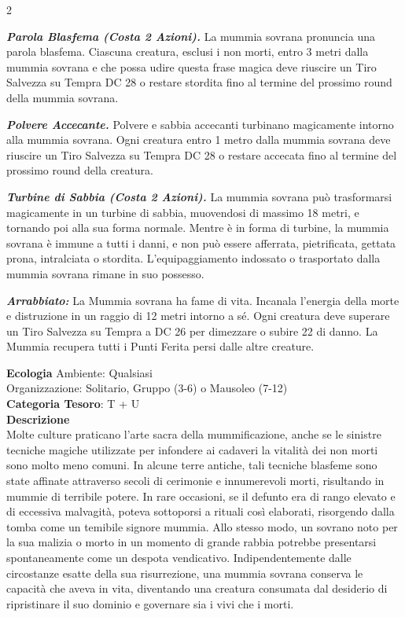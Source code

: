 \begin{multicols}{2}
{\emph{\textbf{Parola Blasfema (Costa 2 Azioni).}} La mummia sovrana pronuncia una parola blasfema. Ciascuna creatura, esclusi i non morti, entro 3 metri dalla mummia sovrana e che possa udire questa frase magica deve riuscire un Tiro Salvezza su Tempra DC 28 o restare stordita fino al termine del prossimo round della mummia sovrana.

\emph{\textbf{Polvere Accecante.}} Polvere e sabbia accecanti turbinano magicamente intorno alla mummia sovrana. Ogni creatura entro 1 metro dalla mummia sovrana deve riuscire un Tiro Salvezza su Tempra DC 28 o restare accecata fino al termine del prossimo round della creatura.

\emph{\textbf{Turbine di Sabbia (Costa 2 Azioni).}} La mummia sovrana può trasformarsi magicamente in un turbine di sabbia, muovendosi di massimo 18 metri, e tornando poi alla sua forma normale. Mentre è in forma di turbine, la mummia sovrana è immune a tutti i danni, e non può essere afferrata, pietrificata, gettata prona, intralciata o stordita. L'equipaggiamento indossato o trasportato dalla mummia sovrana rimane in suo possesso.

\emph{\textbf{Arrabbiato:}} La Mummia sovrana ha fame di vita. Incanala l'energia della morte e distruzione in un raggio di 12 metri intorno a sé. Ogni creatura deve superare un Tiro Salvezza su Tempra a DC 26 per dimezzare o subire 22 di danno. La Mummia recupera tutti i Punti Ferita persi dalle altre creature.

\textbf{Ecologia}
Ambiente: Qualsiasi\\
Organizzazione: Solitario, Gruppo (3-6) o Mausoleo (7-12)\\
\textbf{Categoria Tesoro}: T + U\\
\textbf{Descrizione}\\
Molte culture praticano l'arte sacra della mummificazione, anche se le sinistre tecniche magiche utilizzate per infondere ai cadaveri la vitalità dei non morti sono molto meno comuni. In alcune terre antiche, tali tecniche blasfeme sono state affinate attraverso secoli di cerimonie e innumerevoli morti, risultando in mummie di terribile potere. In rare occasioni, se il defunto era di rango elevato e di eccessiva malvagità, poteva sottoporsi a rituali così elaborati, risorgendo dalla tomba come un temibile signore mummia. Allo stesso modo, un sovrano noto per la sua malizia o morto in un momento di grande rabbia potrebbe presentarsi spontaneamente come un despota vendicativo. Indipendentemente dalle circostanze esatte della sua risurrezione, una mummia sovrana conserva le capacità che aveva in vita, diventando una creatura consumata dal desiderio di ripristinare il suo dominio e governare sia i vivi che i morti.

}
\end{multicols}
